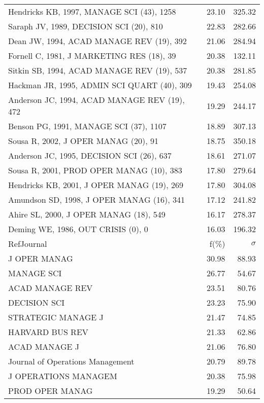 \documentclass[a4paper,11pt]{report}
\begin{document}
\begin{landscape}
\begin{table}[!ht]
{\begin{tabular}{|l r r|}
Hendricks KB, 1997, MANAGE SCI (43), 1258 & 23.10 & 325.32\\
Saraph JV, 1989, DECISION SCI (20), 810 & 22.83 & 282.66\\
Dean JW, 1994, ACAD MANAGE REV (19), 392 & 21.06 & 284.94\\
Fornell C, 1981, J MARKETING RES (18), 39 & 20.38 & 132.11\\
Sitkin SB, 1994, ACAD MANAGE REV (19), 537 & 20.38 & 281.85\\
Hackman JR, 1995, ADMIN SCI QUART (40), 309 & 19.43 & 254.08\\
Anderson JC, 1994, ACAD MANAGE REV (19), 472 & 19.29 & 244.17\\
Benson PG, 1991, MANAGE SCI (37), 1107 & 18.89 & 307.13\\
Sousa R, 2002, J OPER MANAG (20), 91 & 18.75 & 350.18\\
Anderson JC, 1995, DECISION SCI (26), 637 & 18.61 & 271.07\\
Sousa R, 2001, PROD OPER MANAG (10), 383 & 17.80 & 279.64\\
Hendricks KB, 2001, J OPER MANAG (19), 269 & 17.80 & 304.08\\
Amundson SD, 1998, J OPER MANAG (16), 341 & 17.12 & 241.82\\
Ahire SL, 2000, J OPER MANAG (18), 549 & 16.17 & 278.37\\
Deming WE, 1986, OUT CRISIS (0), 0 & 16.03 & 196.32\\
\hline
\hline
RefJournal & f(\%) & $\sigma$\\
\hline
J OPER MANAG & 30.98 & 88.93\\
MANAGE SCI & 26.77 & 54.67\\
ACAD MANAGE REV & 23.51 & 80.76\\
DECISION SCI & 23.23 & 75.90\\
STRATEGIC MANAGE J & 21.47 & 74.85\\
HARVARD BUS REV & 21.33 & 62.86\\
ACAD MANAGE J & 21.06 & 76.80\\
Journal of Operations Management & 20.79 & 89.78\\
J OPERATIONS MANAGEM & 20.38 & 75.98\\
PROD OPER MANAG & 19.29 & 50.64\\
\hline
\end{tabular}
}
\end{table}

\clearpage


\end{landscape}
\end{document}
